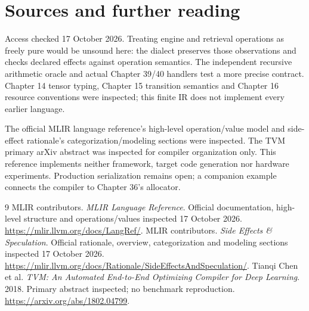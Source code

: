 \chapter*{Sources and further reading}
Access checked 17 October 2026. Treating engine and retrieval operations as freely pure would be unsound here: the dialect preserves those observations and checks declared effects against operation semantics.
The independent recursive arithmetic oracle and actual Chapter 39/40
handlers test a more precise contract. Chapter 14 tensor typing,
Chapter 15 transition semantics and Chapter 16 resource conventions were
inspected; this finite IR does not implement every earlier language.

The official MLIR language reference's high-level operation/value model and
side-effect rationale's categorization/modeling sections were inspected.
The TVM primary arXiv abstract was inspected for compiler organization only.
This reference implements neither framework, target code generation nor
hardware experiments. Production serialization remains open; a companion example connects the compiler to Chapter 36's allocator.
\begingroup
\renewcommand{\bibname}{References}
\let\chapter\section
\begin{thebibliography}{9}
 MLIR contributors.
\emph{MLIR Language Reference}. Official documentation, high-level structure
and operations/values inspected 17 October 2026.
\url{https://mlir.llvm.org/docs/LangRef/}.
 MLIR contributors.
\emph{Side Effects \& Speculation}. Official rationale, overview,
categorization and modeling sections inspected 17 October 2026.
\url{https://mlir.llvm.org/docs/Rationale/SideEffectsAndSpeculation/}.
 Tianqi Chen et al.
\emph{TVM: An Automated End-to-End Optimizing Compiler for Deep Learning}.
2018. Primary abstract inspected; no benchmark reproduction.
\url{https://arxiv.org/abs/1802.04799}.
\end{thebibliography}
\endgroup
